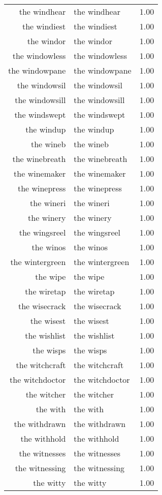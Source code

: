 \begin{table}[ht]
\begin{tabular}{rlr}
  the windhear & the windhear & 1.00 \\ 
  the windiest & the windiest & 1.00 \\ 
  the windor & the windor & 1.00 \\ 
  the windowless & the windowless & 1.00 \\ 
  the windowpane & the windowpane & 1.00 \\ 
  the windowsil & the windowsil & 1.00 \\ 
  the windowsill & the windowsill & 1.00 \\ 
  the windswept & the windswept & 1.00 \\ 
  the windup & the windup & 1.00 \\ 
  the wineb & the wineb & 1.00 \\ 
  the winebreath & the winebreath & 1.00 \\ 
  the winemaker & the winemaker & 1.00 \\ 
  the winepress & the winepress & 1.00 \\ 
  the wineri & the wineri & 1.00 \\ 
  the winery & the winery & 1.00 \\ 
  the wingsreel & the wingsreel & 1.00 \\ 
  the winos & the winos & 1.00 \\ 
  the wintergreen & the wintergreen & 1.00 \\ 
  the wipe & the wipe & 1.00 \\ 
  the wiretap & the wiretap & 1.00 \\ 
  the wisecrack & the wisecrack & 1.00 \\ 
  the wisest & the wisest & 1.00 \\ 
  the wishlist & the wishlist & 1.00 \\ 
  the wisps & the wisps & 1.00 \\ 
  the witchcraft & the witchcraft & 1.00 \\ 
  the witchdoctor & the witchdoctor & 1.00 \\ 
  the witcher & the witcher & 1.00 \\ 
  the with & the with & 1.00 \\ 
  the withdrawn & the withdrawn & 1.00 \\ 
  the withhold & the withhold & 1.00 \\ 
  the witnesses & the witnesses & 1.00 \\ 
  the witnessing & the witnessing & 1.00 \\ 
  the witty & the witty & 1.00 \\ 

\end{tabular}
\end{table}
